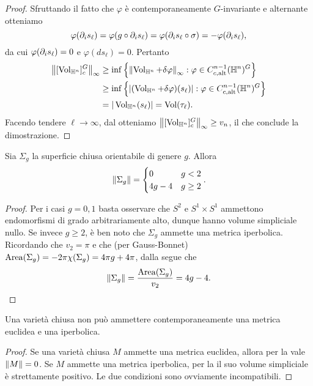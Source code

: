 \begin{proof}
Sfruttando il fatto che $\varphi$ è contemporaneamente $G$-invariante e alternante otteniamo
\[
\varphi(\partial_i s_\ell)=\varphi(g\circ\partial_i s_\ell)=\varphi(\partial_i s_\ell\circ\sigma)=-\varphi(\partial_i s_\ell),
\]
da cui $\varphi(\partial_i s_\ell)=0$ e $\varphi(ds_\ell)=0$. Pertanto
\begin{align*}
\left\lVert [\operatorname{Vol}_{\mathbb{H}^n}]^G_c\right\rVert_\infty&\ge\inf\left\{\left\lVert \operatorname{Vol}_{\mathbb{H}^n}+\delta\varphi\right\rVert_\infty:\varphi\in C^{n-1}_{c,\operatorname{alt}}(\mathbb{H}^n)^G\right\}\\
&\ge\inf\left\{|(\operatorname{Vol}_{\mathbb{H}^n}+\delta\varphi)(s_\ell)|:\varphi\in C^{n-1}_{c,\operatorname{alt}}(\mathbb{H}^n)^G\right\}\\
&=|\operatorname{Vol}_{\mathbb{H}^n}(s_\ell)|=\operatorname{Vol}(\tau_\ell).
\end{align*}
Facendo tendere $\ell\to\infty$, dal  otteniamo $\left\lVert [\operatorname{Vol}_{\mathbb{H}^n}]^G_c\right\rVert_{\infty}\ge v_n$, il che conclude la dimostrazione.
\end{proof}

\begin{corollary}
Sia $\Sigma_g$ la superficie chiusa orientabile di genere $g$. Allora
\[
\left\lVert \Sigma_g\right\rVert=
\begin{cases}
0&g<2\\
4g-4&g\ge 2
\end{cases}.
\]
\end{corollary}
\begin{proof}
Per i casi $g=0,1$ basta osservare che $S^2$ e $S^1\times S^1$ ammettono endomorfismi di grado arbitrariamente alto, dunque hanno volume simpliciale nullo. Se invece $g\ge2$, è ben noto che $\Sigma_g$ ammette una metrica iperbolica. Ricordando che $v_2=\pi$ e che (per Gauss-Bonnet) $\operatorname{Area}(\Sigma_g)=-2\pi\chi(\Sigma_g)=4\pi g+4\pi$, dalla  segue che
\[
\left\lVert \Sigma_g\right\rVert=\frac{\operatorname{Area}(\Sigma_g)}{v_2}=4g-4.\qedhere
\]
\end{proof}

\begin{corollary}
Una varietà chiusa non può ammettere contemporaneamente una metrica euclidea e una iperbolica.
\end{corollary}
\begin{proof}
Se una varietà chiusa $M$ ammette una metrica euclidea, allora per la  vale $\left\lVert M\right\rVert=0$. Se $M$ ammette una metrica iperbolica, per la   il suo volume simpliciale è strettamente positivo. Le due condizioni sono ovviamente incompatibili.
\end{proof}